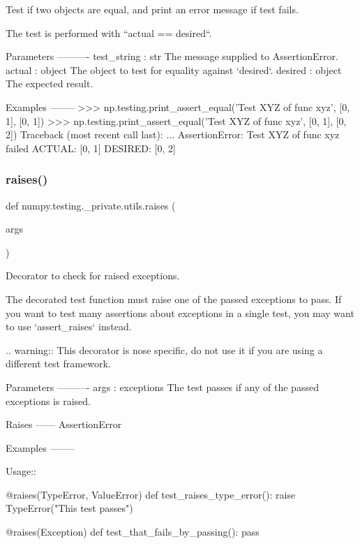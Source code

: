 \begin{DoxyVerb}Test if two objects are equal, and print an error message if test fails.

The test is performed with ``actual == desired``.

Parameters
----------
test_string : str
    The message supplied to AssertionError.
actual : object
    The object to test for equality against `desired`.
desired : object
    The expected result.

Examples
--------
>>> np.testing.print_assert_equal('Test XYZ of func xyz', [0, 1], [0, 1])
>>> np.testing.print_assert_equal('Test XYZ of func xyz', [0, 1], [0, 2])
Traceback (most recent call last):
...
AssertionError: Test XYZ of func xyz failed
ACTUAL:
[0, 1]
DESIRED:
[0, 2]\end{DoxyVerb}
 \mbox{\label{namespacenumpy_1_1testing_1_1__private_1_1utils_af50ad97ef3fcf1029e5250c655c06687}} 
\subsubsection{\texorpdfstring{raises()}{raises()}}
{\footnotesize\ttfamily def numpy.\+testing.\+\_\+private.\+utils.\+raises (\begin{DoxyParamCaption}\item[{}]{args }\end{DoxyParamCaption})}

\begin{DoxyVerb}Decorator to check for raised exceptions.

The decorated test function must raise one of the passed exceptions to
pass.  If you want to test many assertions about exceptions in a single
test, you may want to use `assert_raises` instead.

.. warning::
   This decorator is nose specific, do not use it if you are using a
   different test framework.

Parameters
----------
args : exceptions
    The test passes if any of the passed exceptions is raised.

Raises
------
AssertionError

Examples
--------

Usage::

    @raises(TypeError, ValueError)
    def test_raises_type_error():
        raise TypeError("This test passes")

    @raises(Exception)
    def test_that_fails_by_passing():
        pass\end{DoxyVerb}
 \mbox{\label{namespacenumpy_1_1testing_1_1__private_1_1utils_a7893225a239144d72d56ad9a90a77aeb}} 
